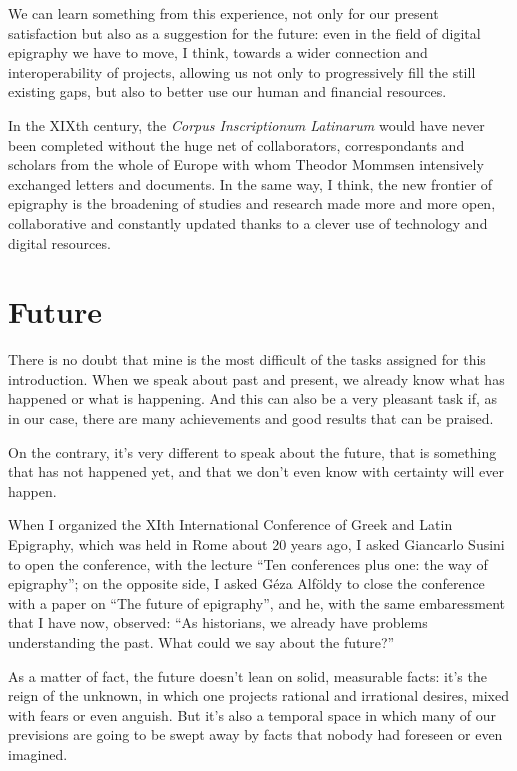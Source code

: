 We can learn something from this experience, not only for our present satisfaction but also as a suggestion for the future: even in the field of digital epigraphy we have to move, I think, towards a wider connection and interoperability of projects, allowing us not only to progressively fill the still existing gaps, but also to better use our human and financial resources.


In the XIXth century, the \emph{Corpus Inscriptionum Latinarum} would have never been completed without the huge net of collaborators, correspondants and scholars from the whole of Europe with whom Theodor Mommsen intensively exchanged letters and documents. In the same way, I think, the new frontier of epigraphy is the broadening of studies and research made more and more open, collaborative and constantly updated thanks to a clever use of technology and digital resources.


\section*{Future}
There is no doubt that mine is the most difficult of the tasks assigned for this introduction. When we speak about past and present, we already know what has happened or what is happening. And this can also be a very pleasant task if, as in our case, there are many achievements and good results that can be praised.

On the contrary, it’s very different to speak about the future, that is something that has not happened yet, and that we don’t even know with certainty will ever happen. 

When I organized the XIth International Conference of Greek and Latin Epigraphy, which was held in Rome about 20 years ago, I asked Giancarlo Susini to open the conference, with the lecture ``Ten conferences plus one: the way of epigraphy''; on the opposite side, I asked Géza Alföldy to close the conference with a paper on ``The future of epigraphy'', and he, with the same embaressment that I have now, observed: ``As historians, we already have problems understanding the past. What could we say about the future?''

As a matter of fact, the future doesn’t lean on solid, measurable facts: it’s the reign of the unknown, in which one projects rational and irrational desires, mixed with fears or even anguish. But it’s also a temporal space in which many of our previsions are going to be swept away by facts that nobody had foreseen or even imagined.

